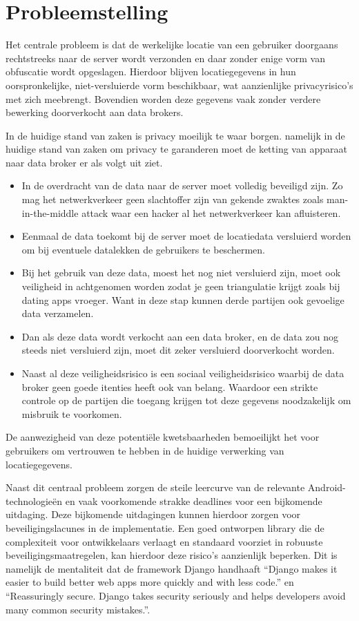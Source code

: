 \section{Probleemstelling}
Het centrale probleem is dat de werkelijke locatie van een gebruiker doorgaans rechtstreeks naar de server wordt verzonden en daar zonder enige vorm van obfuscatie wordt opgeslagen. Hierdoor blijven locatiegegevens in hun oorspronkelijke, niet-versluierde vorm beschikbaar, wat aanzienlijke privacyrisico’s met zich meebrengt. Bovendien worden deze gegevens vaak zonder verdere bewerking doorverkocht aan data brokers.

In de huidige stand van zaken is privacy moeilijk te waar borgen. namelijk in de huidige stand van zaken om privacy te garanderen moet de ketting van apparaat naar data broker er als volgt uit ziet.
\begin{itemize}
    \item In de overdracht van de data naar de server moet volledig beveiligd zijn. Zo mag het netwerkverkeer geen slachtoffer zijn van gekende zwaktes zoals man-in-the-middle attack waar een hacker al het netwerkverkeer kan afluisteren.
    \item Eenmaal de data toekomt bij de server moet de locatiedata versluierd  worden om bij eventuele datalekken de gebruikers te beschermen.
    \item Bij het gebruik van deze data, moest het nog niet versluierd zijn, moet ook veiligheid in achtgenomen worden zodat je geen triangulatie krijgt zoals bij dating apps vroeger. Want in deze stap kunnen derde partijen ook gevoelige data verzamelen.
    \item Dan als deze data wordt verkocht aan een data broker, en de data zou nog steeds niet versluierd zijn, moet dit zeker versluierd doorverkocht worden.
    \item Naast al deze veiligheidsrisico is een sociaal veiligheidsrisico waarbij de data broker geen goede itenties heeft ook van belang. Waardoor een strikte controle op de partijen die toegang krijgen tot deze gegevens noodzakelijk om misbruik te voorkomen.
\end{itemize}

De aanwezigheid van deze potentiële kwetsbaarheden bemoeilijkt het voor gebruikers om vertrouwen te hebben in de huidige verwerking van locatiegegevens.

Naast dit centraal probleem zorgen de steile leercurve van de relevante Android-technologieën en vaak voorkomende strakke deadlines voor een bijkomende uitdaging.
Deze bijkomende uitdagingen kunnen hierdoor zorgen voor beveiligingslacunes in de implementatie.
Een goed ontworpen library die de complexiteit voor ontwikkelaars verlaagt en standaard voorziet in robuuste beveiligingsmaatregelen, kan hierdoor deze risico’s aanzienlijk beperken.
Dit is namelijk de mentaliteit dat de framework Django handhaaft \enquote{Django makes it easier to build better web apps more quickly and with less code.} en \enquote{Reassuringly secure. Django takes security seriously and helps developers avoid many common security mistakes.}. \cite{django}


